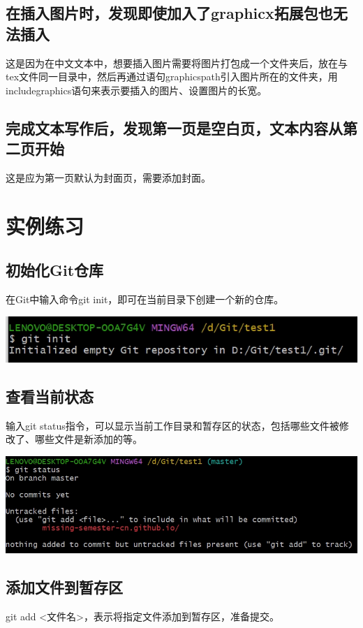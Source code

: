 \documentclass[UTF8,a4paper]{ctexart}
\begin{document}
\begin{sloppypar}
	\subsection{在插入图片时，发现即使加入了graphicx拓展包也无法插入}
	这是因为在中文文本中，想要插入图片需要将图片打包成一个文件夹后，放在与tex文件同一目录中，然后再通过语句graphicspath引入图片所在的文件夹，用includegraphics语句来表示要插入的图片、设置图片的长宽。
	\subsection{完成文本写作后，发现第一页是空白页，文本内容从第二页开始}
	这是应为第一页默认为封面页，需要添加封面。
	
	\section{实例练习}
	\subsection{初始化Git仓库}
	在Git中输入命令git init，即可在当前目录下创建一个新的仓库。
	
	\includegraphics[width = 16cm]{11}
	
	\subsection{查看当前状态}
	输入git status指令，可以显示当前工作目录和暂存区的状态，包括哪些文件被修改了、哪些文件是新添加的等。
	
	\includegraphics[width = 16cm]{12}
	
	\subsection{添加文件到暂存区}
	git add <文件名>，表示将指定文件添加到暂存区，准备提交。
	

\end{sloppypar}
\end{document}
